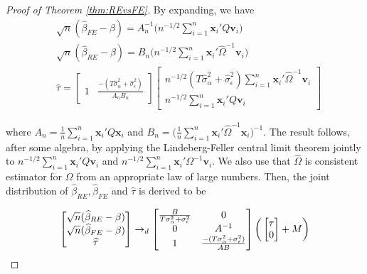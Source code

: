 \begin{proof}[Proof of Theorem \ref{thm:REvsFE}]
By expanding, we have 
\begin{align*}
&\sqrt{n} (\widehat{\beta}_{FE} - \beta) = A_n^{-1} \bigg ( n^{-1/2} \sum_{i=1}^n \mathbf{x}_i' Q \mathbf{v}_i  \bigg) \\
&\sqrt{n} (\widehat{\beta}_{RE} - \beta) = B_n \bigg (n^{-1/2} \sum_{i=1}^n \mathbf{x}_i' \widehat{\Omega}^{-1} \mathbf{v}_i  \bigg) \\
& \widehat{\tau} = \begin{bmatrix}
1 & \frac{-(T\widehat{\sigma}_\alpha^2 + \widehat{\sigma}_\epsilon^2)}{A_n B_n} 
\end{bmatrix} \begin{bmatrix}
n^{-1/2}(T\widehat{\sigma}_\alpha^2 + \widehat{\sigma}_\epsilon^2)\sum_{i=1}^n \mathbf{x}_i' \widehat{\Omega}^{-1} \mathbf{v}_i\\
n^{-1/2}\sum_{i=1}^n \mathbf{x}_i' Q \mathbf{v}_i
\end{bmatrix}
\end{align*}

where $A_n = \frac{1}{n} \sum_{i=1}^n \mathbf{x}_i' Q \mathbf{x}_i$ and $B_n = \big( \frac{1}{n} \sum_{i=1}^n \mathbf{x}_i' \widehat{\Omega}^{-1} \mathbf{x}_i \big)^{-1} $. The result follows, after some algebra, by applying the Lindeberg-Feller central limit theorem jointly to $n^{-1/2} \sum_{i=1}^n \mathbf{x}_i'Q\mathbf{v}_i$ and $n^{-1/2}\sum_{i=1}^n \mathbf{x}_i' \Omega^{-1} \mathbf{v}_i$. We also use that $\widehat{\Omega}$ is consistent estimator for $\Omega$ from an appropriate law of large numbers. Then, the joint distribution of $\widehat{\beta}_{RE}, \widehat{\beta}_{FE}$ and $\widehat{\tau}$ is derived to be

\[
 \begin{bmatrix}
\sqrt{n} (\widehat{\beta}_{RE} - \beta)\\
\sqrt{n} (\widehat{\beta}_{FE} - \beta)\\
\widehat{\tau}
\end{bmatrix} \rightarrow_d  \begin{bmatrix}
\frac{B}{T\sigma_\alpha^2 + \sigma_\epsilon^2} & 0 \\
0 & A^{-1} \\
1 & \frac{-(T\sigma_\alpha^2 + \sigma_\epsilon^2)}{AB}\\
\end{bmatrix} \bigg(\begin{bmatrix}
\tau\\
0
\end{bmatrix}   + M  \bigg)\\
\]



\end{proof}
